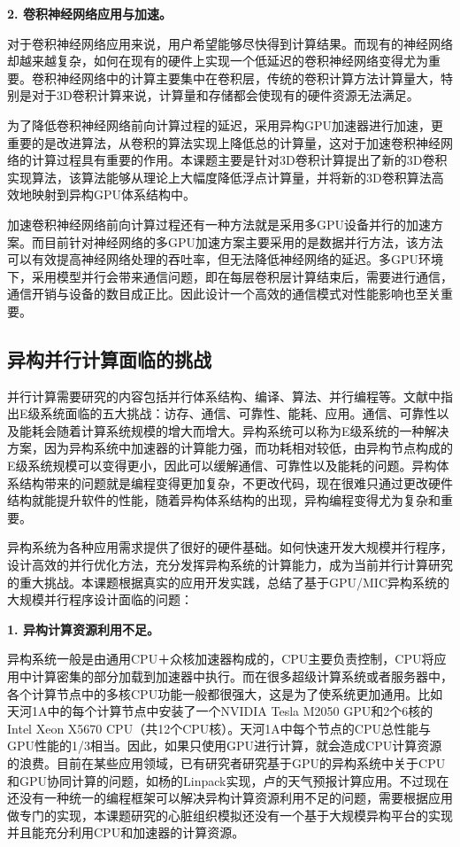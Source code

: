  \textbf{2.  卷积神经网络应用与加速。}
 
对于卷积神经网络应用来说，用户希望能够尽快得到计算结果。而现有的神经网络却越来越复杂，如何在现有的硬件上实现一个低延迟的卷积神经网络变得尤为重要。卷积神经网络中的计算主要集中在卷积层，传统的卷积计算方法计算量大，特别是对于3D卷积计算来说，计算量和存储都会使现有的硬件资源无法满足。

为了降低卷积神经网络前向计算过程的延迟，采用异构GPU加速器进行加速，更重要的是改进算法，从卷积的算法实现上降低总的计算量，这对于加速卷积神经网络的计算过程具有重要的作用。本课题主要是针对3D卷积计算提出了新的3D卷积实现算法，该算法能够从理论上大幅度降低浮点计算量，并将新的3D卷积算法高效地映射到异构GPU体系结构中。

加速卷积神经网络前向计算过程还有一种方法就是采用多GPU设备并行的加速方案。而目前针对神经网络的多GPU加速方案主要采用的是数据并行方法，该方法可以有效提高神经网络处理的吞吐率，但无法降低神经网络的延迟。多GPU环境下，采用模型并行会带来通信问题，即在每层卷积层计算结束后，需要进行通信，通信开销与设备的数目成正比。因此设计一个高效的通信模式对性能影响也至关重要。

 
 \subsection{异构并行计算面临的挑战}
并行计算需要研究的内容包括并行体系结构、编译、算法、并行编程等。文献中指出E级系统面临的五大挑战：访存、通信、可靠性、能耗、应用。通信、可靠性以及能耗会随着计算系统规模的增大而增大。异构系统可以称为E级系统的一种解决方案，因为异构系统中加速器的计算能力强，而功耗相对较低，由异构节点构成的E级系统规模可以变得更小，因此可以缓解通信、可靠性以及能耗的问题。异构体系结构带来的问题就是编程变得更加复杂，不更改代码，现在很难只通过更改硬件结构就能提升软件的性能，随着异构体系结构的出现，异构编程变得尤为复杂和重要。
 
异构系统为各种应用需求提供了很好的硬件基础。如何快速开发大规模并行程序，设计高效的并行优化方法，充分发挥异构系统的计算能力，成为当前并行计算研究的重大挑战。本课题根据真实的应用开发实践，总结了基于GPU/MIC异构系统的大规模并行程序设计面临的问题：
 
 \textbf{1. 异构计算资源利用不足。}
 
异构系统一般是由通用CPU＋众核加速器构成的，CPU主要负责控制，CPU将应用中计算密集的部分加载到加速器中执行。而在很多超级计算系统或者服务器中，各个计算节点中的多核CPU功能一般都很强大，这是为了使系统更加通用。比如天河1A中的每个计算节点中安装了一个NVIDIA Tesla M2050 GPU和2个6核的Intel Xeon X5670 CPU（共12个CPU核）。天河1A中每个节点的CPU总性能与GPU性能的1/3相当。因此，如果只使用GPU进行计算，就会造成CPU计算资源的浪费。目前在某些应用领域，已有研究者研究基于GPU的异构系统中关于CPU和GPU协同计算的问题，如杨的Linpack实现，卢的天气预报计算应用。不过现在还没有一种统一的编程框架可以解决异构计算资源利用不足的问题，需要根据应用做专门的实现，本课题研究的心脏组织模拟还没有一个基于大规模异构平台的实现并且能充分利用CPU和加速器的计算资源。
 
